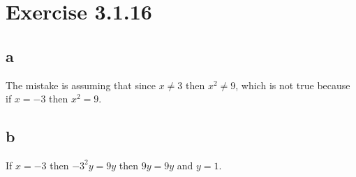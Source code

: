\documentclass{article}
\begin{document}
\section*{Exercise 3.1.16}
\subsection*{a}
The mistake is assuming that since $x \neq 3$ then $x^2 \neq 9$, which is not true because if $x = -3$ then $x^2 = 9$.
\subsection*{b}
If $x = -3$ then $-3^2y=9y$ then $9y=9y$ and $y = 1$.
\end{document}
